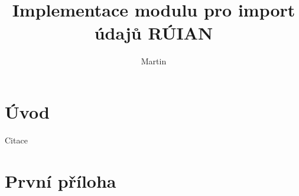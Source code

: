 \documentclass[czech, kiv, ba, he, iso690alph, pdf]{fasthesis}
\title{Implementace modulu pro import údajů RÚIAN}
\author{Martin}{Schön}
\begin{document}
\frontpages[tm]
\tableofcontents
\chapter{Úvod}
Citace \cite{vsavskova2013vsachy}

\appendix
\chapter{První příloha}
\backmatter
\printbibliography
\backpage
\end{document}
